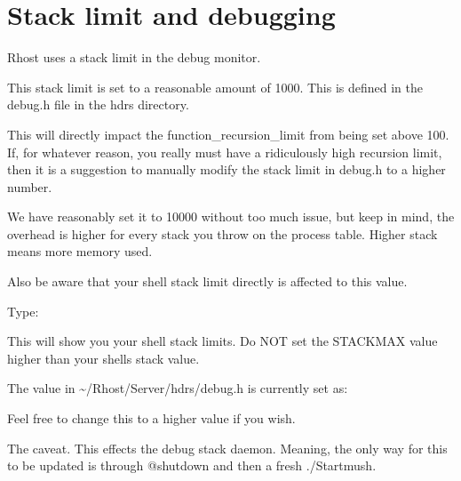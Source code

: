 \documentclass[letterpaper,10pt,english]{sphinxmanual}
\begin{document}
\begin{sphinxVerbatim}[commandchars=\\\{\}]
\end{sphinxVerbatim}


\section{Stack limit and debugging}
\label{\detokenize{troubleshooting:stack-limit-and-debugging}}
\sphinxAtStartPar
Rhost uses a stack limit in the debug monitor.

\sphinxAtStartPar
This stack limit is set to a reasonable amount of 1000.
This is defined in the debug.h file in the hdrs directory.

\sphinxAtStartPar
This will directly impact the function\_recursion\_limit from being
set above 100.  If, for whatever reason, you really must have
a ridiculously high recursion limit, then it is a suggestion to
manually modify the stack limit in debug.h to a higher number.

\sphinxAtStartPar
We have reasonably set it to 10000 without too much issue, but keep
in mind, the overhead is higher for every stack you throw on the
process table.  Higher stack means more memory used.

\sphinxAtStartPar
Also be aware that your shell stack limit directly is affected
to this value.

\sphinxAtStartPar
Type:

\begin{sphinxVerbatim}[commandchars=\\\{\}]
 
\end{sphinxVerbatim}

\sphinxAtStartPar
This will show you your shell stack limits.  Do NOT set the
STACKMAX value higher than your shell\textquotesingle{}s stack value.

\sphinxAtStartPar
The value in \textasciitilde{}/Rhost/Server/hdrs/debug.h is currently set as:

\begin{sphinxVerbatim}[commandchars=\\\{\}]
\end{sphinxVerbatim}

\sphinxAtStartPar
Feel free to change this to a higher value if you wish.

\sphinxAtStartPar
The caveat.  This effects the debug stack daemon.  Meaning,
the only way for this to be updated is through @shutdown and
then a fresh ./Startmush.
\end{document}
